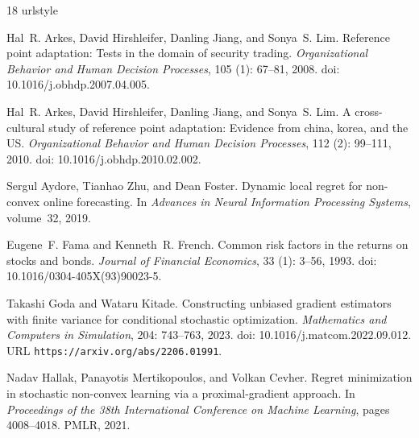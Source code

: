 \documentclass[11pt]{article}
\newcommand{\1}{\mathbf 1}
\begin{document}
\clearpage
\begin{thebibliography}{18}
\providecommand{\natexlab}[1]{#1}
\providecommand{\url}[1]{\texttt{#1}}
\expandafter\ifx\csname urlstyle\endcsname\relax
  \providecommand{\doi}[1]{doi: #1}\else
  \providecommand{\doi}{doi: \begingroup \urlstyle{rm}\Url}\fi

Hal~R. Arkes, David Hirshleifer, Danling Jiang, and Sonya~S. Lim.
\newblock Reference point adaptation: Tests in the domain of security trading.
\newblock \emph{Organizational Behavior and Human Decision Processes},
  105 (1): 67--81, 2008.
\newblock \doi{10.1016/j.obhdp.2007.04.005}.

Hal~R. Arkes, David Hirshleifer, Danling Jiang, and Sonya~S. Lim.
\newblock A cross-cultural study of reference point adaptation: Evidence from
  china, korea, and the {US}.
\newblock \emph{Organizational Behavior and Human Decision Processes},
  112 (2): 99--111, 2010.
\newblock \doi{10.1016/j.obhdp.2010.02.002}.

Sergul Aydore, Tianhao Zhu, and Dean Foster.
\newblock Dynamic local regret for non-convex online forecasting.
\newblock In \emph{Advances in Neural Information Processing Systems},
  volume~32, 2019.

Eugene~F. Fama and Kenneth~R. French.
\newblock Common risk factors in the returns on stocks and bonds.
\newblock \emph{Journal of Financial Economics}, 33 (1):
  3--56, 1993.
\newblock \doi{10.1016/0304-405X(93)90023-5}.

Takashi Goda and Wataru Kitade.
\newblock Constructing unbiased gradient estimators with finite variance for
  conditional stochastic optimization.
\newblock \emph{Mathematics and Computers in Simulation}, 204:
  743--763, 2023.
\newblock \doi{10.1016/j.matcom.2022.09.012}.
\newblock URL \url{https://arxiv.org/abs/2206.01991}.

Nadav Hallak, Panayotis Mertikopoulos, and Volkan Cevher.
\newblock Regret minimization in stochastic non-convex learning via a
  proximal-gradient approach.
\newblock In \emph{Proceedings of the 38th International Conference on Machine
  Learning}, pages 4008--4018. PMLR, 2021.


\end{thebibliography}
\end{document}
